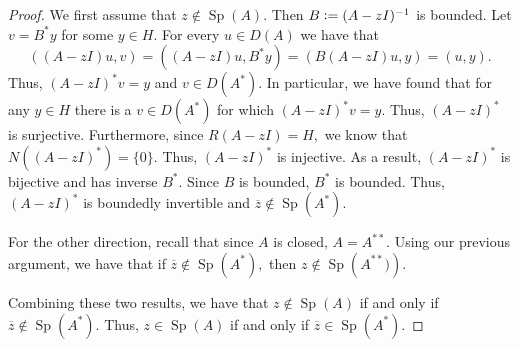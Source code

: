 \documentclass[12pt,a4paper]{article}
\newcommand{\defeq}{\vcentcolon=}
\newcommand{\Sp}[1]{\operatorname{Sp}\!\left(#1\right)}
\theoremstyle{boldthm}
\theoremstyle{bolddefn}
\begin{document}
\begin{proof}
    We first assume that $z \notin \Sp{A}.$ Then $B \defeq (A-zI)^{-1}$ is bounded. Let $v = B^* y$ for some $y \in H.$ For every $u \in D(A)$ we have that 
\begin{equation}
    ((A-zI)u,v) = ((A-zI)u, B^*y) = (B(A-zI)u, y) = (u, y).
\end{equation}
Thus, $(A-zI)^* v = y$ and $v \in D(A^*).$ In particular, we have found that for any $y\in H$ there is a $v \in D(A^*)$ for which $(A-zI)^* v = y.$ Thus, $(A-zI)^*$ is surjective. Furthermore, since $R(A-zI) = H,$ we know that $N((A-zI)^*) = \{0\}.$ Thus, $(A-zI)^*$ is injective. As a result, $(A-zI)^*$ is bijective and has inverse $B^*.$ Since $B$ is bounded, $B^*$ is bounded. Thus, $(A-zI)^*$ is boundedly invertible and $\overline z \notin \Sp{A^*}.$

For the other direction, recall that since $A$ is closed, $A = A^{**}.$ Using our previous argument, we have that if $\overline z \notin \Sp{A^*},$ then $z \notin \Sp{A^{**})}.$ 

Combining these two results, we have that $z \notin \Sp{A}$ if and only if $\overline z \notin \Sp{A^*}.$ Thus, $z \in \Sp{A}$ if and only if $\overline z \in \Sp{A^*}.$
\end{proof}


\end{document}
